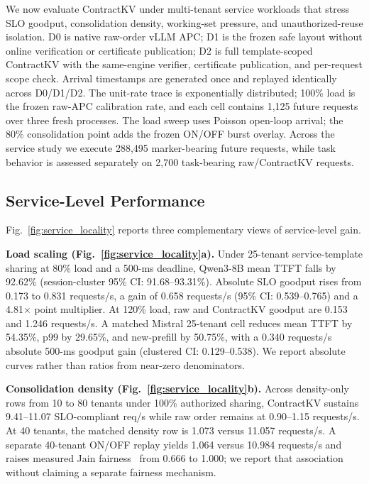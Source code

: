 \documentclass[journal]{IEEEtran}
\begin{document}
We now evaluate ContractKV under multi-tenant service workloads that stress SLO goodput, consolidation density, working-set pressure, and unauthorized-reuse isolation. D0 is native raw-order vLLM APC; D1 is the frozen safe layout without online verification or certificate publication; D2 is full template-scoped ContractKV with the same-engine verifier, certificate publication, and per-request scope check. Arrival timestamps are generated once and replayed identically across D0/D1/D2. The unit-rate trace is exponentially distributed; 100\% load is the frozen raw-APC calibration rate, and each cell contains 1{,}125 future requests over three fresh processes. The load sweep uses Poisson open-loop arrival; the 80\% consolidation point adds the frozen ON/OFF burst overlay. Across the service study we execute 288{,}495 marker-bearing future requests, while task behavior is assessed separately on 2{,}700 task-bearing raw/ContractKV requests.

\subsection{Service-Level Performance}
\label{sec:service_perf}

Fig.~\ref{fig:service_locality} reports three complementary views of service-level gain.

\smallskip
\noindent\textbf{Load scaling (Fig.~\ref{fig:service_locality}a).}
Under 25-tenant service-template sharing at 80\% load and a 500-ms deadline, Qwen3-8B mean TTFT falls by 92.62\% (session-cluster 95\% CI: 91.68--93.31\%). Absolute SLO goodput rises from 0.173 to 0.831 requests/s, a gain of 0.658 requests/s (95\% CI: 0.539--0.765) and a 4.81$\times$ point multiplier. At 120\% load, raw and ContractKV goodput are 0.153 and 1.246 requests/s. A matched Mistral 25-tenant cell reduces mean TTFT by 54.35\%, p99 by 29.65\%, and new-prefill by 50.75\%, with a 0.340 requests/s absolute 500-ms goodput gain (clustered CI: 0.129--0.538). We report absolute curves rather than ratios from near-zero denominators.

\smallskip
\noindent\textbf{Consolidation density (Fig.~\ref{fig:service_locality}b).}
Across density-only rows from 10 to 80 tenants under 100\% authorized sharing, ContractKV sustains 9.41--11.07 SLO-compliant req/s while raw order remains at 0.90--1.15 requests/s. At 40 tenants, the matched density row is 1.073 versus 11.057 requests/s. A separate 40-tenant ON/OFF replay yields 1.064 versus 10.984 requests/s and raises measured Jain fairness~\cite{jain1998} from 0.666 to 1.000; we report that association without claiming a separate fairness mechanism.
\end{document}
